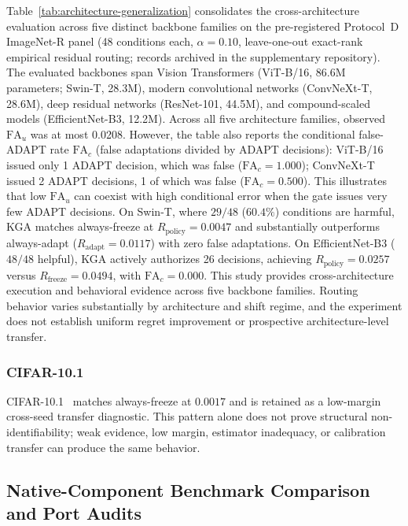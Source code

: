 Table~\ref{tab:architecture-generalization} consolidates the cross-architecture evaluation across five distinct backbone families on the pre-registered Protocol~D ImageNet-R panel (48 conditions each, $\alpha = 0.10$, leave-one-out exact-rank empirical residual routing; records archived in the supplementary repository). The evaluated backbones span Vision Transformers (ViT-B/16, 86.6M parameters; Swin-T, 28.3M), modern convolutional networks (ConvNeXt-T, 28.6M), deep residual networks (ResNet-101, 44.5M), and compound-scaled models (EfficientNet-B3, 12.2M). Across all five architecture families, observed $\mathrm{FA}_u$ was at most 0.0208. However, the table also reports the conditional false-ADAPT rate $\mathrm{FA}_c$ (false adaptations divided by ADAPT decisions): ViT-B/16 issued only 1 ADAPT decision, which was false ($\mathrm{FA}_c = 1.000$); ConvNeXt-T issued 2 ADAPT decisions, 1 of which was false ($\mathrm{FA}_c = 0.500$). This illustrates that low $\mathrm{FA}_u$ can coexist with high conditional error when the gate issues very few ADAPT decisions. On Swin-T, where $29/48$ ($60.4\%$) conditions are harmful, KGA matches always-freeze at $R_{\mathrm{policy}} = 0.0047$ and substantially outperforms always-adapt ($R_{\mathrm{adapt}} = 0.0117$) with zero false adaptations. On EfficientNet-B3 ($48/48$ helpful), KGA actively authorizes 26 \adapt decisions, achieving $R_{\mathrm{policy}} = 0.0257$ versus $R_{\mathrm{freeze}} = 0.0494$, with $\mathrm{FA}_c = 0.000$. This study provides cross-architecture execution and behavioral evidence across five backbone families. Routing behavior varies substantially by architecture and shift regime, and the experiment does not establish uniform regret improvement or prospective architecture-level transfer.



\subsubsection{CIFAR-10.1}

CIFAR-10.1~\cite{recht2019cifar10} matches always-freeze at $0.0017$ and is retained as a low-margin cross-seed transfer
diagnostic. This pattern alone does not prove structural non-identifiability; weak evidence, low
margin, estimator inadequacy, or calibration transfer can produce the same behavior.

\subsection{Native-Component Benchmark Comparison and Port Audits}
\label{app:historical-ports}
\label{app:baseline-ports}

